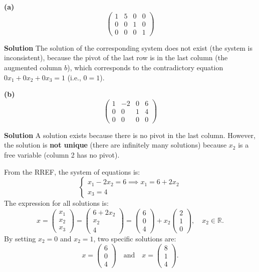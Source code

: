 \documentclass[12pt,a4paper]{article}
\begin{document}
\textbf{(a)}
\[
\begin{pmatrix}
	1 & 5 & 0 & 0\\
	0 & 0 & 1 & 0\\
	0 & 0 & 0 & 1
\end{pmatrix}
\]

\textbf{Solution}
The solution of the corresponding system does not exist (the system is inconsistent), because the pivot of the last row is in the last column (the augmented column $b$), which corresponds to the contradictory equation $0x_1 + 0x_2 + 0x_3 = 1$ (i.e., $0 = 1$).
\par\nopagebreak\vspace{1cm}

\Needspace{7cm}
\textbf{(b)}
\[
\begin{pmatrix}
	1 & -2 & 0 & 6\\
	0 & 0 & 1 & 4\\
	0 & 0 & 0 & 0
\end{pmatrix}
\]

\textbf{Solution}
A solution exists because there is no pivot in the last column. However, the solution is \textbf{not unique} (there are infinitely many solutions) because $x_2$ is a free variable (column 2 has no pivot).

From the RREF, the system of equations is:
\[
\begin{cases}
	x_1 - 2x_2 = 6 \implies x_1 = 6 + 2x_2 \\
	x_3 = 4
\end{cases}
\]
The expression for all solutions is:
\[
x = \begin{pmatrix} x_1 \\ x_2 \\ x_3 \end{pmatrix} 
= \begin{pmatrix} 6 + 2x_2 \\ x_2 \\ 4 \end{pmatrix} 
= \begin{pmatrix} 6 \\ 0 \\ 4 \end{pmatrix} + x_2 \begin{pmatrix} 2 \\ 1 \\ 0 \end{pmatrix}, \quad x_2 \in \mathbb{R}.
\]
By setting $x_2 = 0$ and $x_2 = 1$, two specific solutions are:
\[
x = \begin{pmatrix} 6 \\ 0 \\ 4 \end{pmatrix} \quad \text{and} \quad x = \begin{pmatrix} 8 \\ 1 \\ 4 \end{pmatrix}.
\]
\par\nopagebreak\vspace{1cm}
\end{document}
